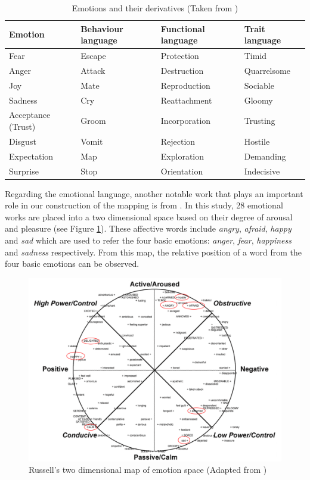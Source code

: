 \begin{table}
\caption{Emotions and their derivatives (Taken from \citet{plutchik2001integration})}
\label{table:derivationOfEmotion}
\centering
\begin{tabular}{|p{3cm}|p{3cm}|p{3cm}|p{3cm}|}
\hline
\textbf{Emotion} & \textbf{Behaviour language} & \textbf{Functional language} & \textbf{Trait language} \\ \hline \hline
Fear & Escape & Protection & Timid \\ \hline
Anger & Attack & Destruction & Quarrelsome \\ \hline
Joy & Mate & Reproduction & Sociable \\ \hline
Sadness & Cry & Reattachment & Gloomy \\ \hline
Acceptance (Trust) & Groom & Incorporation & Trusting \\ \hline
Disgust & Vomit & Rejection & Hostile \\ \hline
Expectation & Map & Exploration & Demanding \\ \hline
Surprise & Stop & Orientation & Indecisive \\ \hline
\end{tabular}
\end{table}

Regarding the emotional language, another notable work that plays an important role in our construction of the mapping is from \citet{russell1980circumplex}. In this study, 28 emotional works are placed into a two dimensional space based on their degree of arousal and pleasure (see Figure \ref{fig:emotionSpace}). These affective words include \textit{angry}, \textit{afraid}, \textit{happy} and \textit{sad} which are used to refer the four basic emotions: \textit{anger}, \textit{fear}, \textit{happiness} and \textit{sadness} respectively. From this map, the relative position of a word from the four basic emotions can be observed.

\begin{figure}[htb!] 
\centering    
\includegraphics[width=1.0\textwidth]{EmotionSpace}
\caption{Russell's two dimensional map of emotion space (Adapted from \citet{scherer2005emotions})}
\label{fig:emotionSpace}
\end{figure}

